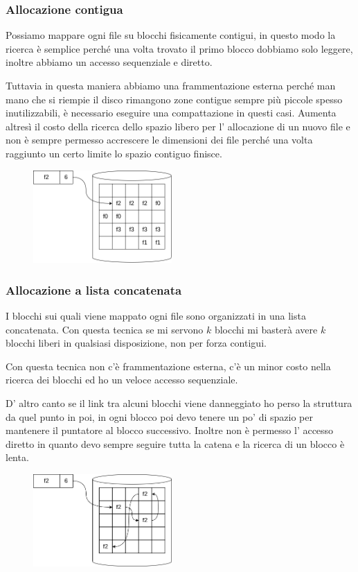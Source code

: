 {\subsubsection{Allocazione contigua}
Possiamo mappare ogni file su blocchi fisicamente contigui, in questo modo la ricerca è semplice perché una volta trovato il primo blocco dobbiamo solo leggere, inoltre abbiamo un accesso sequenziale e diretto.

Tuttavia in questa maniera abbiamo una frammentazione esterna perché man mano che si riempie il disco rimangono zone contigue sempre più piccole spesso inutilizzabili, è necessario eseguire una compattazione in questi casi.
Aumenta altresì il costo della ricerca dello spazio libero per l' allocazione di un nuovo file e non è sempre permesso accrescere le dimensioni dei file perché una volta raggiunto un certo limite lo spazio contiguo finisce.
\begin{figure}[H]
    \centering
    \includegraphics[width=200px]{images/11_File_System/allocazione_contigua.png}
\end{figure}

\subsubsection{Allocazione a lista concatenata}
I blocchi sui quali viene mappato ogni file sono organizzati in una lista concatenata.
Con questa tecnica se mi servono $k$ blocchi mi basterà avere $k$ blocchi liberi in qualsiasi disposizione, non per forza contigui.

Con questa tecnica non c'è frammentazione esterna, c'è un minor costo nella ricerca dei blocchi ed ho un veloce accesso sequenziale.

D' altro canto se il link tra alcuni blocchi viene danneggiato ho perso la struttura da quel punto in poi, in ogni blocco poi devo tenere un po' di spazio per mantenere il puntatore al blocco successivo.
Inoltre non è permesso l' accesso diretto in quanto devo sempre seguire tutta la catena e la ricerca di un blocco è lenta.
\begin{figure}[H]
    \centering
    \includegraphics[width=200px]{images/11_File_System/allocazione_lista_concatenata.png}
\end{figure}

}
